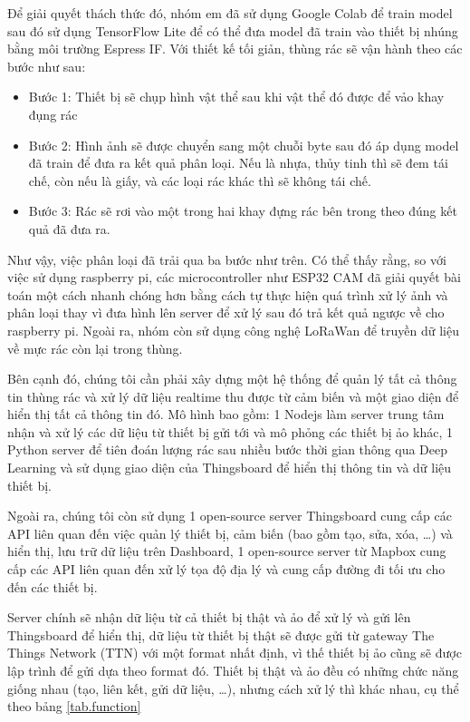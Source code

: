 Để giải quyết thách thức đó, nhóm em đã sử dụng Google Colab để train model sau đó sử dụng TensorFlow Lite để có thể đưa model đã train vào thiết bị nhúng bằng môi trường Espress IF.
Với thiết kế tối giản, thùng rác sẽ vận hành theo các bước như sau: 
\begin{itemize}
    \item Bước 1: Thiết bị sẽ chụp hình vật thể sau khi vật thể đó được để vảo khay đụng rác
    \item Bước 2: Hình ảnh sẽ được chuyển sang một chuỗi byte sau đó áp dụng model đã train để đưa ra kết quả phân loại. Nếu là nhựa, thủy tinh thì sẽ đem tái chế, còn nếu là giấy, và các loại rác khác thì sẽ không tái chế.
    \item Bước 3: Rác sẽ rơi vào một trong hai khay đựng rác bên trong theo đúng kết quả đã đưa ra.
\end{itemize}
Như vậy, việc phân loại đã trải qua ba bước như trên.
Có thể thấy rằng, so với việc sử dụng raspberry pi, các microcontroller như ESP32 CAM đã giải quyết bài toán một cách nhanh chóng hơn bằng cách tự thực hiện quá trình xử lý ảnh và phân loại thay vì đưa hình lên server để xử lý sau đó trả kết quả ngược về cho raspberry pi.
Ngoài ra, nhóm còn sử dụng công nghệ LoRaWan để truyền dữ liệu về mực rác còn lại trong thùng.

Bên cạnh đó, chúng tôi cần phải xây dựng một hệ thống để quản lý tất cả thông tin thùng rác và xử lý dữ liệu realtime thu được từ cảm biến và một giao diện để hiển thị tất cả thông tin đó. Mô hình bao gồm: 1 Nodejs làm server trung tâm nhận và xử lý các dữ liệu từ thiết bị gửi tới và mô phỏng các thiết bị ảo khác, 1 Python server để tiên đoán lượng rác sau nhiều bước thời gian thông qua Deep Learning và sử dụng giao diện của Thingsboard để hiển thị thông tin và dữ liệu thiết bị.

Ngoài ra, chúng tôi còn sử dụng 1 open-source server Thingsboard cung cấp các API liên quan đến việc quản lý thiết bị, cảm biến (bao gồm tạo, sửa, xóa, …) và hiển thị, lưu trữ dữ liệu trên Dashboard, 1 open-source server từ Mapbox cung cấp các API liên quan đến xử lý tọa độ địa lý và cung cấp đường đi tối ưu cho đến các thiết bị.

Server chính sẽ nhận dữ liệu từ cả thiết bị thật và ảo để xử lý và gửi lên Thingsboard để hiển thị, dữ liệu từ thiết bị thật sẽ được gửi từ gateway The Things Network (TTN) với một format nhất định, vì thế thiết bị ảo cũng sẽ được lập trình để gửi dựa theo format đó. Thiết bị thật và ảo đều có những chức năng giống nhau (tạo, liên kết, gửi dữ liệu, …), nhưng cách xử lý thì khác nhau, cụ thể theo bảng \ref{tab.function}

